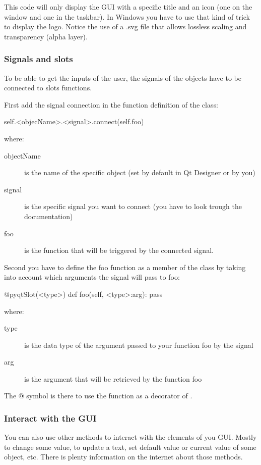 \documentclass[english, 12 pt, openany, oneside]{book}
\begin{document}
This code will only display the GUI with a specific title and an icon (one on the window and one in the taskbar). In Windows you have to use that kind of trick to display the logo. Notice the use of a .svg file that allows lossless scaling and transparency (alpha layer).


\subsubsection{Signals and slots}
To be able to get the inputs of the user, the signals of the objects have to be connected to slots functions.

First add the signal connection in the  function definition of the  class:

\begin{pyverbatim}
self.<objecName>.<signal>.connect(self.foo)
\end{pyverbatim}

where:

\begin{description}
\item[objectName] is the name of the specific object (set by default in Qt Designer or by you)
\item[signal] is the specific signal you want to connect (you have to look trough the documentation)
\item[foo] is the function that will be triggered by the connected signal.
\end{description}

Second you have to define the foo function as a member of the  class by taking into account which arguments the signal will pass to foo:

\begin{pyverbatim}
@pyqtSlot(<type>)
def foo(self, <type>:arg):
	pass
\end{pyverbatim}
where:

\begin{description}
\item[type] is the data type of the argument passed to your function foo by the signal
\item[arg] is the argument that will be retrieved by the function foo
\end{description}

The @ symbol is there to use the function as a decorator of .

\subsubsection{Interact with the GUI}
You can also use other methods to interact with the elements of you GUI. Mostly to change some value, to update a text, set default value or current value of some object, etc. There is plenty information on the internet about those methods.
\end{document}

